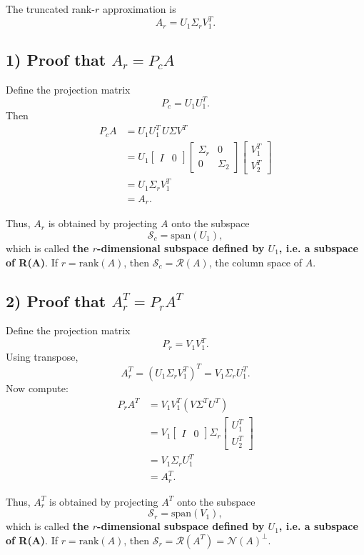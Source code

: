 \documentclass[12pt]{article}
\begin{document}
The truncated rank-$r$ approximation is
\[
A_r = U_1 \Sigma_r V_1^T.
\]

\subsection*{1) Proof that $A_r = P_c A$}
Define the projection matrix
\[
P_c = U_1 U_1^T.
\]
Then
\[
\begin{aligned}
P_c A
&= U_1 U_1^T \, U \Sigma V^T \\
&= U_1
\begin{bmatrix} I & 0 \end{bmatrix}
\begin{bmatrix}
\Sigma_r & 0 \\
0 & \Sigma_2
\end{bmatrix}
\begin{bmatrix} V_1^T \\ V_2^T \end{bmatrix} \\
&= U_1 \Sigma_r V_1^T \\
&= A_r.
\end{aligned}
\]

\noindent
Thus, $A_r$ is obtained by projecting $A$ onto the subspace
\[
\mathcal{S}_c = \mathrm{span}(U_1),
\]
which is called \textbf{the $r$-dimensional subspace defined by $U_1$, i.e. a subspace of R(A)}.
If $r = \mathrm{rank}(A)$, then $\mathcal{S}_c = \mathcal{R}(A)$, the column space of $A$.

\subsection*{2) Proof that $A_r^T = P_r A^T$}
Define the projection matrix
\[
P_r = V_1 V_1^T.
\]
Using transpose,
\[
A_r^T = (U_1 \Sigma_r V_1^T)^T = V_1 \Sigma_r U_1^T.
\]
Now compute:
\[
\begin{aligned}
P_r A^T
&= V_1 V_1^T (V \Sigma^T U^T) \\
&= V_1
\begin{bmatrix} I & 0 \end{bmatrix}
\Sigma_r
\begin{bmatrix} U_1^T \\ U_2^T \end{bmatrix} \\
&= V_1 \Sigma_r U_1^T \\
&= A_r^T.
\end{aligned}
\]

\noindent
Thus, $A_r^T$ is obtained by projecting $A^T$ onto the subspace
\[
\mathcal{S}_r = \mathrm{span}(V_1),
\]
which is called \textbf{the $r$-dimensional subspace defined by $U_1$, i.e. a subspace of R(A)}.
If $r = \mathrm{rank}(A)$, then $\mathcal{S}_r = \mathcal{R}(A^T) = \mathcal{N}(A)^\perp$.
\end{document}
